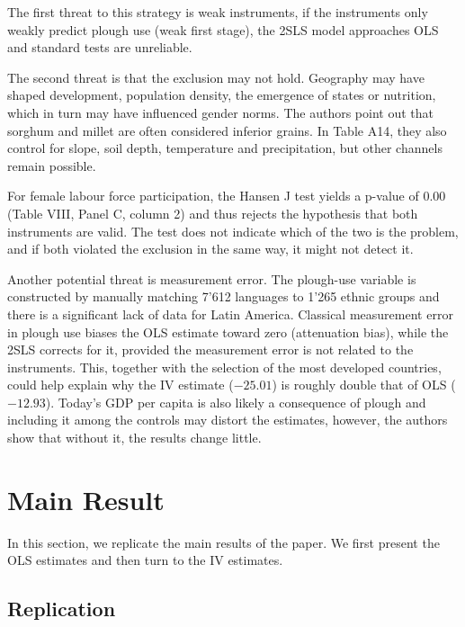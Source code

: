 \documentclass[12pt,a4paper]{article}
\begin{document}
The first threat to this strategy is weak instruments, if the instruments only weakly predict plough use (weak first stage), the 2SLS model approaches OLS and standard tests are unreliable.

The second threat is that the exclusion may not hold. Geography may have shaped development, population density, the emergence of states or nutrition, which in turn may have influenced gender norms. The authors point out that sorghum and millet are often considered inferior grains. In Table A14, they also control for slope, soil depth, temperature and precipitation, but other channels remain possible.

For female labour force participation, the Hansen J test yields a p-value of 0.00 (Table VIII, Panel C, column 2) and thus rejects the hypothesis that both instruments are valid. The test does not indicate which of the two is the problem, and if both violated the exclusion in the same way, it might not detect it.

Another potential threat is measurement error. The plough-use variable is constructed by manually matching 7'612 languages to 1'265 ethnic groups and there is a significant lack of data for Latin America. Classical measurement error in plough use biases the OLS estimate toward zero (attenuation bias), while the 2SLS corrects for it, provided the measurement error is not related to the instruments. This, together with the selection of the most developed countries, could help explain why the IV estimate ($-25.01$) is roughly double that of OLS ($-12.93$). Today's GDP per capita is also likely a consequence of plough and including it among the controls may distort the estimates, however, the authors show that without it, the results change little.

\section{Main Result}

In this section, we replicate the main results of the paper. We first present the OLS estimates and then turn to the IV estimates.

\subsection{Replication}
\end{document}
